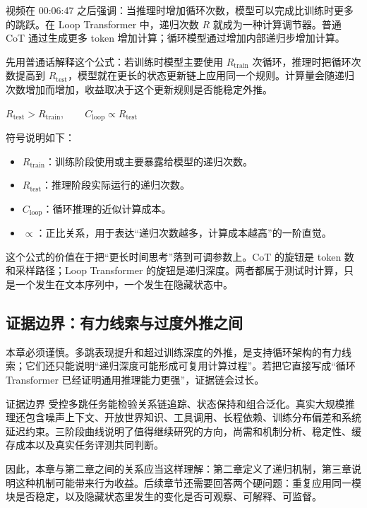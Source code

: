 ﻿\documentclass[a4paper]{article}
\begin{document}
视频在 00:06:47 之后强调：当推理时增加循环次数，模型可以完成比训练时更多的跳跃。在 Loop Transformer 中，递归次数 \(R\) 就成为一种计算调节器。普通 CoT 通过生成更多 token 增加计算；循环模型通过增加内部递归步增加计算。

先用普通话解释这个公式：若训练时模型主要使用 \(R_{\mathrm{train}}\) 次循环，推理时把循环次数提高到 \(R_{\mathrm{test}}\)，模型就在更长的状态更新链上应用同一个规则。计算量会随递归次数增加而增加，收益取决于这个更新规则是否能稳定外推。

$
R_{\mathrm{test}}>R_{\mathrm{train}},\qquad C_{\mathrm{loop}}\propto R_{\mathrm{test}}
$

符号说明如下：
\begin{itemize}
    \item \(R_{\mathrm{train}}\)：训练阶段使用或主要暴露给模型的递归次数。
    \item \(R_{\mathrm{test}}\)：推理阶段实际运行的递归次数。
    \item \(C_{\mathrm{loop}}\)：循环推理的近似计算成本。
    \item \(\propto\)：正比关系，用于表达“递归次数越多，计算成本越高”的一阶直觉。
\end{itemize}

这个公式的价值在于把“更长时间思考”落到可调参数上。CoT 的旋钮是 token 数和采样路径；Loop Transformer 的旋钮是递归深度。两者都属于测试时计算，只是一个发生在文本序列中，一个发生在隐藏状态中。

\subsection{证据边界：有力线索与过度外推之间}

本章必须谨慎。多跳表现提升和超过训练深度的外推，是支持循环架构的有力线索；它们还只能说明“递归深度可能形成可复用计算过程”。若把它直接写成“循环 Transformer 已经证明通用推理能力更强”，证据链会过长。

\begin{warningbox}{证据边界}
受控多跳任务能检验关系链追踪、状态保持和组合泛化。真实大规模推理还包含噪声上下文、开放世界知识、工具调用、长程依赖、训练分布偏差和系统延迟约束。三阶段曲线说明了值得继续研究的方向，尚需和机制分析、稳定性、缓存成本以及真实任务评测共同判断。
\end{warningbox}

因此，本章与第二章之间的关系应当这样理解：第二章定义了递归机制，第三章说明这种机制可能带来行为收益。后续章节还需要回答两个硬问题：重复应用同一模块是否稳定，以及隐藏状态里发生的变化是否可观察、可解释、可监督。
\end{document}
